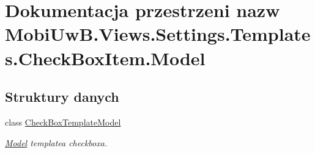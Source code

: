 \hypertarget{a00281}{}\section{Dokumentacja przestrzeni nazw Mobi\+Uw\+B.\+Views.\+Settings.\+Templates.\+Check\+Box\+Item.\+Model}
\label{a00281}
\subsection*{Struktury danych}
\begin{DoxyCompactItemize}
\item 
class \hyperlink{a00010}{Check\+Box\+Template\+Model}
\begin{DoxyCompactList}\small\item\em \hyperlink{a00281}{Model} template\textquotesingle{}a checkbox\textquotesingle{}a. \end{DoxyCompactList}\end{DoxyCompactItemize}

